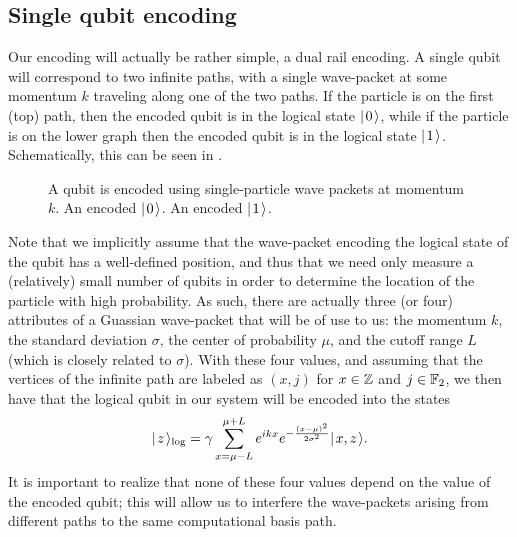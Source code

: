 \documentclass[../thesis-main/thesis-main]{subfiles}
\begin{document}
\subsection{Single qubit encoding}\label{sec:single_qubit_encoding}

Our encoding will actually be rather simple, a dual rail encoding.  A single qubit will correspond to two infinite paths, with a single wave-packet at some momentum $k$ traveling along one of the two paths.  If the particle is on the first (top) path, then the encoded qubit is in the logical state $|\mspace{2mu} 0 \mspace{2mu} \rangle$, while if the particle is on the lower graph then the encoded qubit is in the logical state $|\mspace{2mu} 1 \mspace{2mu} \rangle$.  Schematically, this can be seen in .


\begin{figure}
  \centering
  \qquad
  \caption{A qubit is encoded using single-particle wave packets at momentum $k$.   An encoded $|\mspace{2mu} 0 \mspace{2mu} \rangle$.   An encoded $|\mspace{2mu} 1 \mspace{2mu} \rangle$.}
  \label{fig:wavetrain_encoding}
\end{figure}

Note that we implicitly assume that the wave-packet encoding the logical state of the qubit has a well-defined position, and thus that we need only measure a (relatively) small number of qubits in order to determine the location of the particle with high probability.  As such, there are actually three (or four) attributes of a Guassian wave-packet that will be of use to us: the momentum $k$, the standard deviation $\sigma$, the center of probability $\mu$, and the cutoff range $L$ (which is closely related to $\sigma$).  With these four values, and assuming that the vertices of the infinite path are labeled as $(x,j)$ for $x\in \mathbb{Z}$ and $j\in \mathbb{F}_2$, we then have that the logical qubit in our system will be encoded into the states
\begin{align}
  |\mspace{2mu} z \mspace{2mu} \rangle_{\text{log}} = \gamma \sum_{x = \mu - L}^{\mu + L} e^{ i k x} e^{ - \frac{(x-\mu)^2}{2\sigma^2}} |\mspace{2mu} x,z \mspace{2mu} \rangle \label{eq:single_qubit_encoding}.
\end{align}
It is important to realize that none of these four values depend on the value of the encoded qubit; this will allow us to interfere the wave-packets arising from different paths to the same computational basis path.
\end{document}
